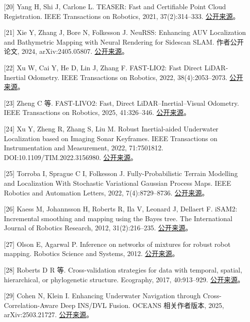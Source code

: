 {[}20{]} Yang H, Shi J, Carlone L. TEASER: Fast and Certifiable Point Cloud Registration. IEEE Transactions on Robotics, 2021, 37(2):314--333. \href{https://arxiv.org/abs/2001.07715}{公开来源}。

{[}21{]} Xie Y, Zhang J, Bore N, Folkesson J. NeuRSS: Enhancing AUV Localization and Bathymetric Mapping with Neural Rendering for Sidescan SLAM. 作者公开论文, 2024, arXiv:2405.05807. \href{https://arxiv.org/abs/2405.05807}{公开来源}。

{[}22{]} Xu W, Cai Y, He D, Lin J, Zhang F. FAST-LIO2: Fast Direct LiDAR-Inertial Odometry. IEEE Transactions on Robotics, 2022, 38(4):2053--2073. \href{https://arxiv.org/abs/2107.06829}{公开来源}。

{[}23{]} Zheng C 等. FAST-LIVO2: Fast, Direct LiDAR--Inertial--Visual Odometry. IEEE Transactions on Robotics, 2025, 41:326--346. \href{https://arxiv.org/abs/2408.14035}{公开来源}。

{[}24{]} Xu Y, Zheng R, Zhang S, Liu M. Robust Inertial-aided Underwater Localization based on Imaging Sonar Keyframes. IEEE Transactions on Instrumentation and Measurement, 2022, 71:7501812. DOI:10.1109/TIM.2022.3156980. \href{https://arxiv.org/abs/2106.16032}{公开来源}。

{[}25{]} Torroba I, Sprague C I, Folkesson J. Fully-Probabilistic Terrain Modelling and Localization With Stochastic Variational Gaussian Process Maps. IEEE Robotics and Automation Letters, 2022, 7(4):8729--8736. \href{https://arxiv.org/abs/2203.10893}{公开来源}。

{[}26{]} Kaess M, Johannsson H, Roberts R, Ila V, Leonard J, Dellaert F. iSAM2: Incremental smoothing and mapping using the Bayes tree. The International Journal of Robotics Research, 2012, 31(2):216--235. \href{https://www.borg.cc.gatech.edu/papers/kaess12ijrr.html}{公开来源}。

{[}27{]} Olson E, Agarwal P. Inference on networks of mixtures for robust robot mapping. Robotics Science and Systems, 2012. \href{https://april.eecs.umich.edu/media/pdfs/olson2012rss.pdf}{公开来源}。

{[}28{]} Roberts D R 等. Cross-validation strategies for data with temporal, spatial, hierarchical, or phylogenetic structure. Ecography, 2017, 40:913--929. \href{https://doi.org/10.1111/ecog.02881}{公开来源}。

{[}29{]} Cohen N, Klein I. Enhancing Underwater Navigation through Cross-Correlation-Aware Deep INS/DVL Fusion. OCEANS 相关作者版本, 2025, arXiv:2503.21727. \href{https://arxiv.org/abs/2503.21727}{公开来源}。

